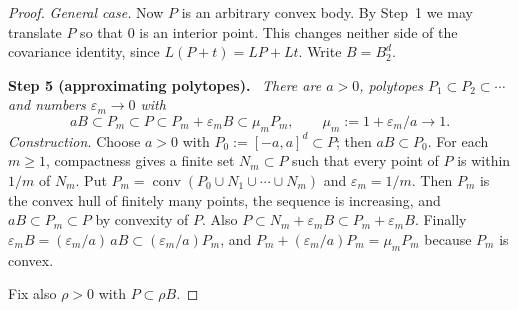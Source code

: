 \documentclass[11pt]{article}
\DeclareMathOperator{\conv}{conv}
\newcommand{\step}[1]{\par\smallskip\noindent\textbf{#1}\ }
\begin{document}
\begin{proof}
\medskip\noindent\emph{General case.} Now \(P\) is an arbitrary convex
body. By Step~1 we may translate \(P\) so that \(0\) is an interior point.
This changes neither side of the covariance identity, since
\(L(P+t)=LP+Lt\). Write \(B=B_2^d\).

\step{Step 5 (approximating polytopes).} \emph{There are \(a>0\),
polytopes \(P_1\subset P_2\subset\cdots\) and numbers \(\varepsilon_m\to0\)
with}
\begin{equation}\label{eq:sandwich}
 aB\subset P_m\subset P\subset P_m+\varepsilon_mB\subset\mu_mP_m,
 \qquad\mu_m:=1+\varepsilon_m/a\longrightarrow1.
\end{equation}
\emph{Construction.} Choose \(a>0\) with \(P_0:=[-a,a]^d\subset P\); then
\(aB\subset P_0\). For each \(m\ge1\), compactness gives a finite set
\(N_m\subset P\) such that every point of \(P\) is within \(1/m\) of
\(N_m\). Put \(P_m=\conv(P_0\cup N_1\cup\cdots\cup N_m)\) and
\(\varepsilon_m=1/m\). Then \(P_m\) is the convex hull of finitely many
points, the sequence is increasing, and \(aB\subset P_m\subset P\) by
convexity of \(P\). Also \(P\subset N_m+\varepsilon_mB\subset
P_m+\varepsilon_mB\). Finally
\(\varepsilon_mB=(\varepsilon_m/a)\,aB\subset(\varepsilon_m/a)P_m\), and
\(P_m+(\varepsilon_m/a)P_m=\mu_mP_m\) because \(P_m\) is convex.

Fix also \(\rho>0\) with \(P\subset\rho B\).


\end{proof}
\end{document}
